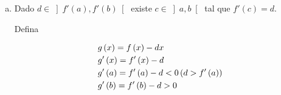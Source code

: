 \documentclass{book}
\begin{document}
\begin{enumerate}
\begin{sol}
\begin{enumerate}[(a)]
(\'e uma das possibilidades), analisemos dois casos:

\begin{enumerate}[(i)]
    \item $f'\left( a \right) < 0 < \displaystyle \frac{{f\left( b \right) - f\left( a \right)}}{{b - a}}$

    \item $\displaystyle \frac{{f\left( b \right) - f\left( a \right)}}{{b - a}} < 0 < f'\left( b \right)$
\end{enumerate}

Em:

\begin{enumerate}[(i)]
\item Temos

\begin{equation*}
g(x) = \left\{ \begin{array}{cl}\displaystyle
                        \frac{{f(x)  - f(a) }}{{x-a}} & \textrm{se } x \ne a\\
f'(a) & \textrm{se } x=a \end{array}\right.
\end{equation*}

$g$ \'e cont\'inua, ent\~ao,

\[
\begin{gathered}
g\left( a \right) = f'\left( a \right) < 0 \hfill \\
g\left( b \right) = \frac{{f\left( b \right) - f\left( a \right)}}{{b - a}} > 0 \hfill \\
\end{gathered}
\]

Ent\~ao, $\exists x_1  \in \left] {a,b} \right[$ tal que $g\left( {x_1 } \right) = \displaystyle \frac{{f\left( {x_1 } \right) - f\left( a \right)}}{{x - a}} = 0$

Pelo TVM, $c \in \left] {a,b} \right[$ tal que $\displaystyle \frac{{f\left( {x_1 } \right) - f\left( a \right)}}{{x - a}} = f'\left( c \right)$.

\item An\'alogo.
\end{enumerate}

\item Dado $d \in \left] {f'\left( a \right),f'\left( b \right)} \right[$ existe $c \in \left] {a,b} \right[$ tal que $f'\left( c \right) = d$.

Defina

\[
\begin{gathered}
g\left( x \right) = f\left( x \right) - dx \hfill \\
g'\left( x \right) = f'\left( x \right) - d \hfill \\
                g'\left( a \right) = f'\left( a \right) - d < 0\left( {d > f'\left( a \right)} \right) \hfill \\
g'\left( b \right) = f'\left( b \right) - d > 0 \hfill \\
\end{gathered}
\]


\end{enumerate}
\end{sol}
\end{enumerate}
\end{document}
